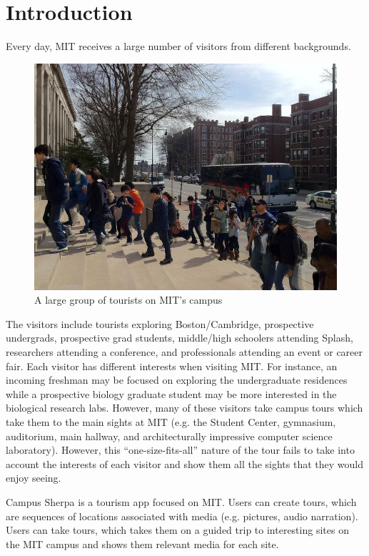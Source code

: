 \documentclass{sigchi}
\begin{document}
\section{Introduction}

Every day, MIT receives a large number of visitors from different backgrounds. 

\begin{figure}[h]
\centering
\includegraphics[width=1.0\linewidth]{./Tourists}
\caption{A large group of tourists on MIT's campus}
\label{fig:Tourists}
\end{figure}

The visitors include tourists exploring Boston/Cambridge, prospective undergrads, prospective grad students, middle/high schoolers attending Splash, researchers attending a conference, and professionals attending an event or career fair. Each visitor has different interests when visiting MIT. For instance, an incoming freshman may be focused on exploring the undergraduate residences while a prospective biology graduate student may be more interested in the biological research labs. However, many of these visitors take campus tours which take them to the main sights at MIT (e.g. the Student Center, gymnasium, auditorium, main hallway, and architecturally impressive computer science laboratory). However, this ``one-size-fits-all'' nature of the tour fails to take into account the interests of each visitor and show them all the sights that they would enjoy seeing. 

Campus Sherpa is a tourism app focused on MIT. Users can create tours, which are sequences of locations associated with media (e.g. pictures, audio narration). Users can take tours, which takes them on a guided trip to interesting sites on the MIT campus and shows them relevant media for each site.
\end{document}
